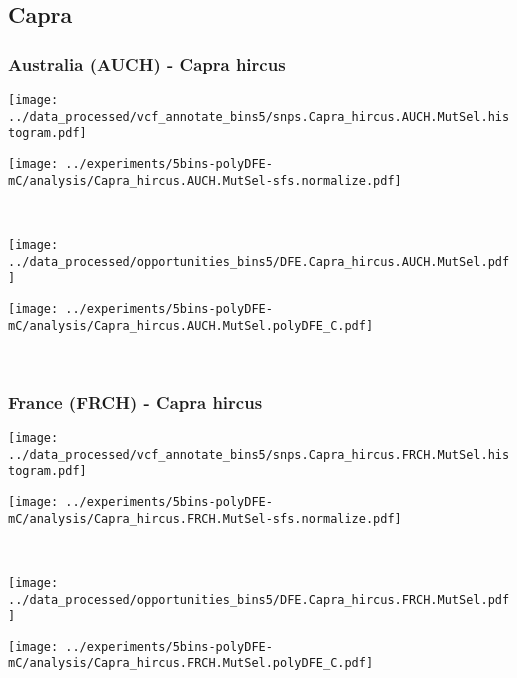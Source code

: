 \subsection{Capra}

\subsubsection{Australia (AUCH) - Capra hircus}

\begin{minipage}{0.49\linewidth}
    \texttt{[image: ../data\_processed/vcf\_annotate\_bins5/snps.Capra\_hircus.AUCH.MutSel.histogram.pdf]}
\end{minipage}
\begin{minipage}{0.49\linewidth}
    \texttt{[image: ../experiments/5bins-polyDFE-mC/analysis/Capra\_hircus.AUCH.MutSel-sfs.normalize.pdf]}
\end{minipage}
\\
\begin{minipage}{0.49\linewidth}
    \texttt{[image: ../data\_processed/opportunities\_bins5/DFE.Capra\_hircus.AUCH.MutSel.pdf]}
\end{minipage}
\begin{minipage}{0.49\linewidth}
    \texttt{[image: ../experiments/5bins-polyDFE-mC/analysis/Capra\_hircus.AUCH.MutSel.polyDFE\_C.pdf]}
\end{minipage}
\\

\subsubsection{France (FRCH) - Capra hircus}

\begin{minipage}{0.49\linewidth}
    \texttt{[image: ../data\_processed/vcf\_annotate\_bins5/snps.Capra\_hircus.FRCH.MutSel.histogram.pdf]}
\end{minipage}
\begin{minipage}{0.49\linewidth}
    \texttt{[image: ../experiments/5bins-polyDFE-mC/analysis/Capra\_hircus.FRCH.MutSel-sfs.normalize.pdf]}
\end{minipage}
\\
\begin{minipage}{0.49\linewidth}
    \texttt{[image: ../data\_processed/opportunities\_bins5/DFE.Capra\_hircus.FRCH.MutSel.pdf]}
\end{minipage}
\begin{minipage}{0.49\linewidth}
    \texttt{[image: ../experiments/5bins-polyDFE-mC/analysis/Capra\_hircus.FRCH.MutSel.polyDFE\_C.pdf]}
\end{minipage}
\\

